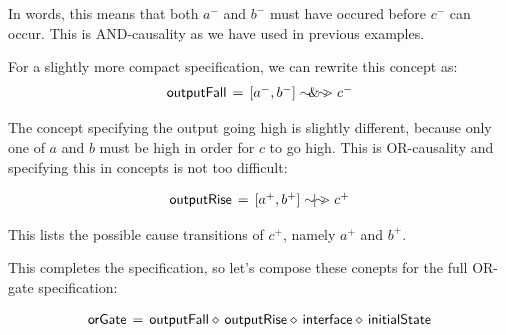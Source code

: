 \documentclass[british,conference,compsoc]{IEEEtran}
\begin{document}
\noindent In words, this means that both $a^{-}$ and $b^{-}$ must have occured before $c^{-}$ can occur. 
This is AND-causality as we have used in previous examples. 

For a slightly more compact specification, we can rewrite this concept as:
\[
\begin{array}{lcl}
\mathsf{outputFall}&\hspace{-2mm}=&\hspace{-2mm}[a^{-}, b^{-}] \sim\hspace{-1.5mm}\&\hspace{-1.5mm}\sim\hspace{-1.5mm}> c^{-} 
\end{array}
\]

\noindent The concept specifying the output going high is slightly different, because only one of
$a$ and $b$ must be high in order for $c$ to go high. This is OR-causality and specifying 
this in concepts is not too difficult: 
                                                                                                                                                                                                                                                                                                                                                        
\[
\begin{array}{lcl}
\mathsf{outputRise}&\hspace{-2mm}=&\hspace{-2mm}[a^{+}, b^{+}] \sim\hspace{-1.5mm}|\hspace{-1.5mm}\sim\hspace{-1.5mm}> c^{+} 
\end{array}
\]

\noindent This lists the possible cause transitions of $c^{+}$, namely $a^{+}$ and $b^{+}$. 

This completes the specification, so let's compose these conepts for the full OR-gate
specification:

\[
\begin{array}{lcl}
\mathsf{orGate}&\hspace{-2mm}=&\hspace{-2mm}\mathsf{outputFall} \diamond\, \mathsf{outputRise} \diamond\, \mathsf{interface} 
\diamond\, \mathsf{initialState}
\end{array}
\]
\end{document}

